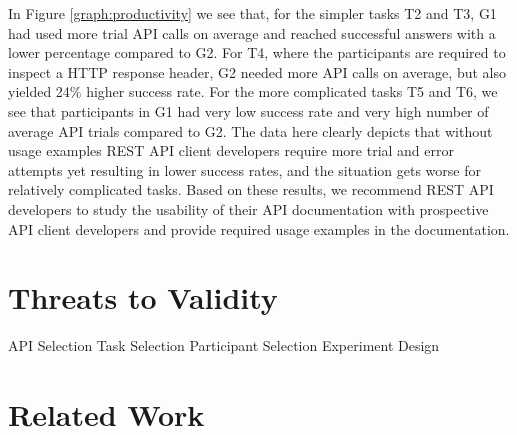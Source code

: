 \documentclass[conference]{IEEEtran}
\begin{document}
In Figure \ref{graph:productivity} we see that, for the simpler tasks T2 and T3, G1 had used more trial API calls on average and reached successful answers with a lower percentage compared to G2. For T4, where the participants are required to inspect a HTTP response header, G2 needed more API calls on average, but also yielded 24\% higher success rate. For the more complicated tasks T5 and T6, we see that participants in G1 had very low success rate and very high number of average API trials compared to G2. The data here clearly depicts that without usage examples REST API client developers require more trial and error attempts yet resulting in lower success rates, and the situation gets worse for relatively complicated tasks. Based on these results, we recommend REST API developers to study the usability of their API documentation with prospective API client developers and provide required usage examples in the documentation.



\section{Threats to Validity}
  API Selection
  Task Selection
  Participant Selection
  Experiment Design

\section{Related Work}
\end{document}
